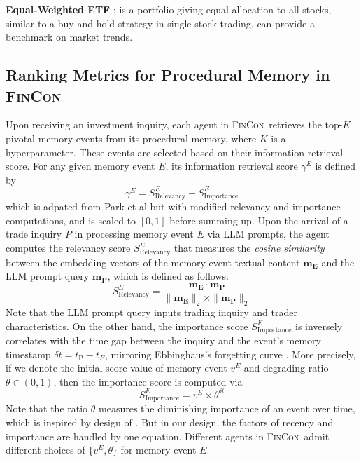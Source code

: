\textbf{Equal-Weighted ETF} \cite{plyakha2012does}: is a portfolio giving equal allocation to all stocks, similar to a buy-and-hold strategy in single-stock trading, can provide a benchmark on market trends.

\subsection{Ranking Metrics for Procedural Memory in \textsc{FinCon}}
\label{memory_rankings}
Upon receiving an investment inquiry, each agent in \textsc{FinCon}\ retrieves the top-$K$ pivotal memory events from its procedural memory, where $K$ is a hyperparameter. These events are selected based on their information retrieval score. For any given memory event $E$, its information retrieval score $\gamma^E$ is defined by
\begin{equation}  \label{eqn:eq4}
\gamma^{E} = S_{\text{Relevancy}}^{E} + S_{\text{Importance}}^{E}
\end{equation}
 which is adpated from Park et al \cite{park2023generative} but with modified relevancy and importance computations, and is scaled to $[0,1]$ before summing up. Upon the arrival of a trade inquiry $P$ in processing memory event $E$ via LLM prompts, the agent computes the relevancy score $S_{\text{Relevancy}}^{E}$ that measures the \textit{cosine similarity} between the embedding vectors of the memory event textual content $\mathbf{m_{E}}$ and the LLM prompt query $\mathbf{m_{P}}$, which is defined as follows: 
\begin{equation} \label{eqn:eq5}
S_{\text{Relevancy}}^{E} = \frac{\mathbf{m_{E}} \cdot \mathbf{m_{P}}}{\|\mathbf{m_{E}}\|_2 \times \|\mathbf{m_{P}}\|_2}
\end{equation}
Note that the LLM prompt query inputs trading inquiry and trader characteristics. On the other hand, the importance score $S_{\text{Importance}}^{E}$ is inversely correlates with the time gap between the inquiry and the event's memory timestamp $\delta t = t_{\text{P}} - t_{E}$, mirroring Ebbinghaus's forgetting curve \cite{murre2015replication}. More precisely, if we denote the initial score value of memory event $v^E$ and degrading ratio $\theta\in(0,1)$, then the importance score is computed via
\begin{equation}
    S_{\text{Importance}}^E = v^{E} \times \theta^{\delta t}
\end{equation}
Note that the ratio $\theta$ measures the diminishing importance of an event over time, which is inspired by design of \cite{park2023generative}. But in our design, the factors of recency and importance are handled by one equation. Different agents in \textsc{FinCon}\ admit different choices of $\{v^E,\theta\}$ for memory event $E$.
 
